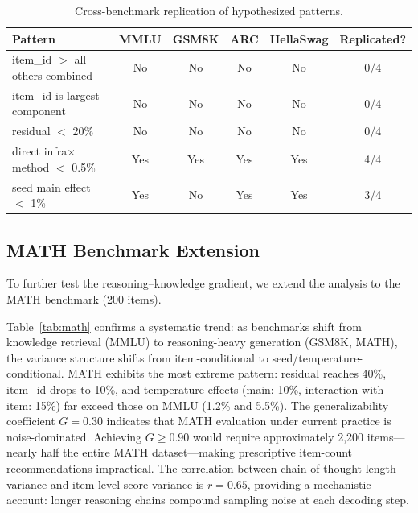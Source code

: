 \documentclass[letterpaper]{article}
\begin{document}
\begin{table}[t]
\centering
\caption{Cross-benchmark replication of hypothesized patterns.}
\label{tab:replication}
\small
\begin{tabular}{lccccc}
\toprule
Pattern & MMLU & GSM8K & ARC & HellaSwag & Replicated? \\
\midrule
item\_id $>$ all others combined & No & No & No & No & 0/4 \\
item\_id is largest component     & No & No & No & No & 0/4 \\
residual $<$ 20\%                 & No & No & No & No & 0/4 \\
direct infra$\times$method $<$ 0.5\% & Yes & Yes & Yes & Yes & 4/4 \\
seed main effect $<$ 1\%          & Yes & No  & Yes & Yes & 3/4 \\
\bottomrule
\end{tabular}
\end{table}


\subsection{MATH Benchmark Extension}

To further test the reasoning--knowledge gradient, we extend the analysis to the MATH benchmark (200 items).

Table~\ref{tab:math} confirms a systematic trend: as benchmarks shift from knowledge retrieval (MMLU) to reasoning-heavy generation (GSM8K, MATH), the variance structure shifts from item-conditional to seed/temperature-conditional.
MATH exhibits the most extreme pattern: residual reaches 40\%, item\_id drops to 10\%, and temperature effects (main: 10\%, interaction with item: 15\%) far exceed those on MMLU (1.2\% and 5.5\%).
The generalizability coefficient $G=0.30$ indicates that MATH evaluation under current practice is noise-dominated.
Achieving $G \geq 0.90$ would require approximately 2{,}200 items---nearly half the entire MATH dataset---making prescriptive item-count recommendations impractical.
The correlation between chain-of-thought length variance and item-level score variance is $r=0.65$, providing a mechanistic account: longer reasoning chains compound sampling noise at each decoding step.
\end{document}
